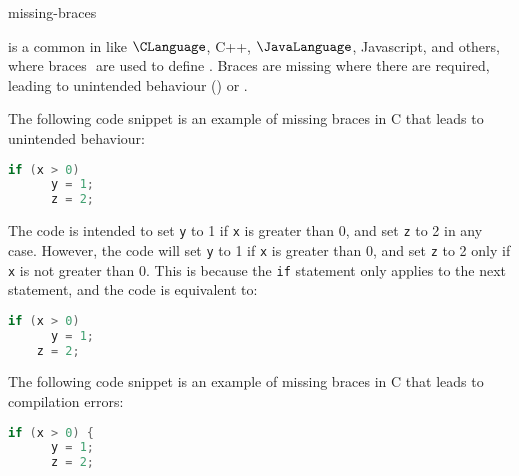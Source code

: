 \documentclass{stex}
\begin{document}
\begin{smodule}[title={Missing Braces}]{missing-braces}

\begin{sdefinition}
   is a common  in  like $\CLanguage$, C++,  $\JavaLanguage$, Javascript, and others, where braces ${ }$ are used to define .
  Braces are missing where there are required, leading to unintended behaviour () or .
\end{sdefinition}

\begin{sexample}
  The following code snippet is an example of missing braces in C that leads to unintended behaviour:
  \begin{lstlisting}[language=C]
    if (x > 0)
      y = 1;
      z = 2;
  \end{lstlisting}
  The code is intended to set \texttt{y} to 1 if \texttt{x} is greater than 0, and set \texttt{z} to 2 in any case.
  However, the code will set \texttt{y} to 1 if \texttt{x} is greater than 0, and set \texttt{z} to 2 only if \texttt{x} is not greater than 0.
  This is because the \texttt{if} statement only applies to the next statement, and the code is equivalent to:
  \begin{lstlisting}[language=C]
    if (x > 0)
      y = 1;
    z = 2;
  \end{lstlisting}
\end{sexample}

\begin{sexample}
  The following code snippet is an example of missing braces in C that leads to compilation errors:
  \begin{lstlisting}[language=C]
    if (x > 0) {
      y = 1;
      z = 2;
  \end{lstlisting}
\end{sexample}





\end{smodule}
\end{document}
